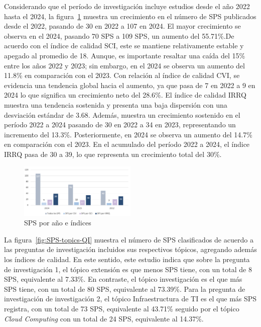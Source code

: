 Considerando que el período de investigación incluye estudios desde el año 2022 hasta el 2024, la figura~\ref{fig:SPS-QI} muestra un crecimiento en el número de SPS publicados desde el 2022, pasando de 30 en 2022 a 107 en 2024. El mayor crecimiento se observa en el 2024, pasando 70 SPS a 109 SPS, un aumento del 55.71\%.De acuerdo con el índice de calidad SCI, este se mantiene relativamente estable y apegado al promedio de 18. Aunque, es importante resaltar una caída del 15\% entre los años 2022 y 2023; sin embargo, en el 2024 se observa un aumento del 11.8\% en comparación con el 2023. Con relación al índice de calidad CVI, se evidencia una tendencia global hacia el aumento, ya que pasa de 7 en 2022 a 9 en 2024 lo que significa un crecimiento neto del 28.6\%. El índice de calidad IRRQ muestra una tendencia sostenida y presenta una baja dispersión con una desviación estándar de 3.68. Además, muestra un crecimiento sostenido en el período 2022 a 2024 pasando de 30 en 2022 a 34 en 2023, representando un incremento del 13.3\%. Posteriormente, en 2024 se observa un aumento del 14.7\% en comparación con el 2023. En el acumulado del período 2022 a 2024, el índice IRRQ pasa de 30 a 39, lo que representa un crecimiento total del 30\%.\\
\begin{figure}[htbp]
    \centering
    \includegraphics[width=0.5\textwidth]{resources/images/resultados/SPS-QI.png}
    \caption{SPS por año e índices}\label{fig:SPS-QI}
\end{figure}
La figura~\ref{fig:SPS-topics-QI} muestra el número de SPS clasificados de acuerdo a las preguntas de investigación incluidos sus respectivos tópicos, agregando además los índices de calidad. En este sentido, este estudio indica que sobre la pregunta de investigación 1, el tópico extensión es que menos SPS tiene, con un total de 8 SPS, equivalente al 7.33\%. En contraste, el tópico investigación es el que más SPS tiene, con un total de 80 SPS, equivalente al 73.39\%. Para la pregunta de investigación de investigación 2, el tópico Infraestructura de TI es el que más SPS registra, con un total de 73 SPS, equivalente al 43.71\% seguido por el tópico \textit{Cloud Computing} con un total de 24 SPS, equivalente al 14.37\%. 

